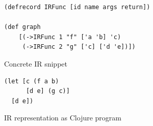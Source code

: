\begin{figure}[h]
\begin{verbatim}
(defrecord IRFunc [id name args return])

(def graph
	[(->IRFunc 1 "f" ['a 'b] 'c)
	 (->IRFunc 2 "g" ['c] ['d 'e])])

\end{verbatim}
\caption{Concrete IR snippet}
\label{fig:concrete-ir-snippet}
\begin{verbatim}
(let [c (f a b)
      [d e] (g c)]
  [d e])
\end{verbatim}
\caption{IR representation as Clojure program}
\label{fig:ir-as-clojure}
\end{figure}

%
%
%
